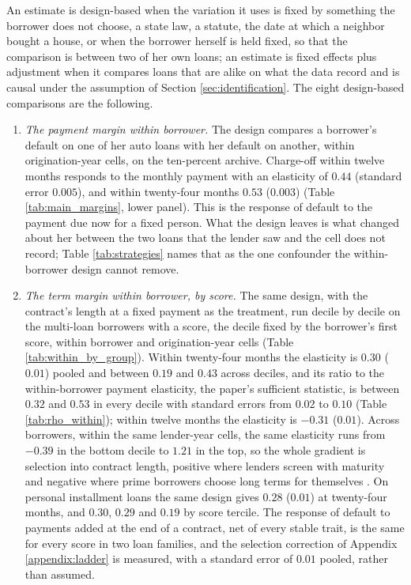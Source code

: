 An estimate is design-based when the variation it uses is fixed by something the borrower does not choose, a state law, a statute, the date at which a neighbor bought a house, or when the borrower herself is held fixed, so that the comparison is between two of her own loans; an estimate is fixed effects plus adjustment when it compares loans that are alike on what the data record and is causal under the assumption of Section \ref{sec:identification}. The eight design-based comparisons are the following.

\begin{enumerate}
\item \emph{The payment margin within borrower.} The design compares a borrower's default on one of her auto loans with her default on another, within origination-year cells, on the ten-percent archive. Charge-off within twelve months responds to the monthly payment with an elasticity of $0.44$ (standard error $0.005$), and within twenty-four months $0.53$ ($0.003$) (Table \ref{tab:main_margins}, lower panel). This is the response of default to the payment due now for a fixed person. What the design leaves is what changed about her between the two loans that the lender saw and the cell does not record; Table \ref{tab:strategies} names that as the one confounder the within-borrower design cannot remove.

\item \emph{The term margin within borrower, by score.} The same design, with the contract's length at a fixed payment as the treatment, run decile by decile on the multi-loan borrowers with a score, the decile fixed by the borrower's first score, within borrower and origination-year cells (Table \ref{tab:within_by_group}). Within twenty-four months the elasticity is $0.30$ ($0.01$) pooled and between $0.19$ and $0.43$ across deciles, and its ratio to the within-borrower payment elasticity, the paper's sufficient statistic, is between $0.32$ and $0.53$ in every decile with standard errors from $0.02$ to $0.10$ (Table \ref{tab:rho_within}); within twelve months the elasticity is $-0.31$ ($0.01$). Across borrowers, within the same lender-year cells, the same elasticity runs from $-0.39$ in the bottom decile to $1.21$ in the top, so the whole gradient is selection into contract length, positive where lenders screen with maturity and negative where prime borrowers choose long terms for themselves \citep{hertzberg_screening_2018}. On personal installment loans the same design gives $0.28$ ($0.01$) at twenty-four months, and $0.30$, $0.29$ and $0.19$ by score tercile. The response of default to payments added at the end of a contract, net of every stable trait, is the same for every score in two loan families, and the selection correction of Appendix \ref{appendix:ladder} is measured, with a standard error of $0.01$ pooled, rather than assumed.


\end{enumerate}
